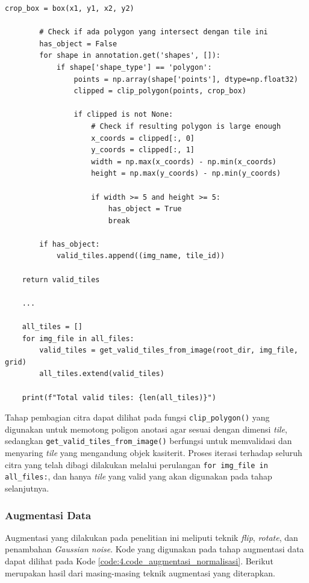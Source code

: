 \begin{lstlisting}[caption={Proses Pembagian Citra (\textit{Image Tiling})}, label={code:4.image_tiling}]
        crop_box = box(x1, y1, x2, y2)
        
        # Check if ada polygon yang intersect dengan tile ini
        has_object = False
        for shape in annotation.get('shapes', []):
            if shape['shape_type'] == 'polygon':
                points = np.array(shape['points'], dtype=np.float32)
                clipped = clip_polygon(points, crop_box)
                
                if clipped is not None:
                    # Check if resulting polygon is large enough
                    x_coords = clipped[:, 0]
                    y_coords = clipped[:, 1]
                    width = np.max(x_coords) - np.min(x_coords)
                    height = np.max(y_coords) - np.min(y_coords)
                    
                    if width >= 5 and height >= 5:
                        has_object = True
                        break
        
        if has_object:
            valid_tiles.append((img_name, tile_id))
    
    return valid_tiles

	...

    all_tiles = []
    for img_file in all_files:
        valid_tiles = get_valid_tiles_from_image(root_dir, img_file, grid)
        all_tiles.extend(valid_tiles)
    
    print(f"Total valid tiles: {len(all_tiles)}")
\end{lstlisting}

Tahap pembagian citra dapat dilihat pada fungsi \texttt{clip\_polygon()} yang digunakan untuk memotong poligon anotasi agar sesuai dengan dimensi \textit{tile}, sedangkan \texttt{get\_valid\_tiles\_from\_image()} berfungsi untuk memvalidasi dan menyaring \textit{tile} yang mengandung objek kasiterit. Proses iterasi terhadap seluruh citra yang telah dibagi dilakukan melalui perulangan \texttt{for img\_file in all\_files:}, dan hanya \textit{tile} yang valid yang akan digunakan pada tahap selanjutnya. \par

\subsubsection{Augmentasi Data}
Augmentasi yang dilakukan pada penelitian ini meliputi teknik \textit{flip}, \textit{rotate}, dan penambahan \textit{Gaussian noise}. Kode yang digunakan pada tahap augmentasi data dapat dilihat pada Kode \ref{code:4.code_augmentasi_normalisasi}. Berikut merupakan hasil dari masing-masing teknik augmentasi yang diterapkan. \par

